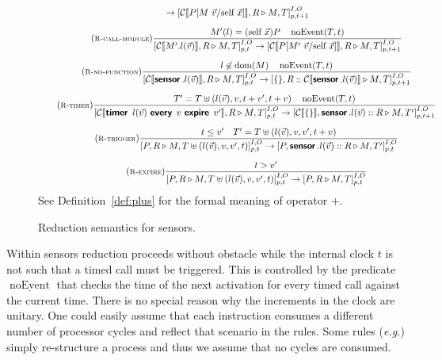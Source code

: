 \documentclass[copyright,creativecommons]{eptcs}
\def\eg{\emph{e.g.}\;}
\newcommand{\keyw}[1]{\textbf{\textsf{#1}}\,}
\newcommand{\firek}{\keyw{timer}}
\newcommand{\everyk}{\keyw{every}}
\newcommand{\expirek}{\keyw{expire}}
\newcommand{\branek}{\keyw{sensor}}
\newcommand{\selfk}{\text{self}}
\newcommand{\sensor}[6]{[{#1} \triangleright {#2}]^{{#3}, {#4}}_{{#5}, {#6}}}
\newcommand{\invk}[3]{{#1}.{#2}({#3})}
\newcommand{\fire}[3]{\firek\ {#1}\ \everyk\ {#2}\ \expirek\ {#3}}
\newcommand{\msg}[2]{{#1}({#2})}
\newcommand{\msgd}{\msg l {\vec v}}
\def\obj#1{\{#1\}}
\newcommand{\dom}{\operatorname{dom}}
\newcommand{\subs}[2]{[{#1}/{#2}]}
\newcommand{\reduces}{\rightarrow}
\newcommand{\mkRrule}[1]{{\footnotesize \textsc{R-#1}}}
\newcommand{\Rlet}{\mkRrule{let}}
\newcommand{\Rfire}{\mkRrule{timer}}
\newcommand{\RcallM}{\mkRrule{call-module}}
\newcommand{\Rnocall}{\mkRrule{no-function}}
\newcommand{\Rtrigger}{\mkRrule{trigger}}
\newcommand{\Rdiscard}{\mkRrule{expire}}
\newcommand{\rulespace}{0.2cm}
\newcommand{\noEvent}[2]{\mathop{\mathrm{noEvent}}\nolimits ({#1}, {#2})}
\newcommand{\noEventd}{\noEvent T t}
\begin{document}
\begin{figure}
\begin{gather*}
{       \reduces
       \sensor {\context{P\subs {M\ \vec v} {\selfk\ \vec x}},R} {M, T} I O p {t+1} 
     }
     \\[\rulespace]
    \tag{\RcallM}
     \frac{
       M'(l) = (\selfk\ \vec x) P \quad  \noEventd
     }{
       \sensor {\context{\invk {M'} l {\vec v}},R} {M,T} I O p t 
       \reduces
       \sensor {\context{P\subs {M'\ \vec v} {\selfk\ \vec x}},R} {M, T} I O p {t+1} 
     }
     \\[\rulespace]
     \tag{\Rnocall}
     \frac{
       l \not\in \dom(M) \quad  \noEventd
     }{
       \sensor {\context{\invk \branek l {\vec v}},R} {M,T} I O p t 
       \reduces
       \sensor {\obj{},R::\context{\invk \branek l {\vec v}}} {M, T} I O p {t+1} 
     }
    \\[\rulespace]
    \tag{\Rfire}
     \frac{
T' = T \uplus (\msgd, v, t + v', t + v)
       \quad \noEventd
}{
       \sensor {\context{\fire \msgd {v} {v'}},R} {M,T} I O p t 
       \reduces
       \sensor {\context{\obj{}},\invk \branek l {\vec v}::R} {M,T'} I O p {t+1} 
     }
     \\[\rulespace]
    \tag{\Rtrigger}
     \frac{
       t \le v'  \quad  T' = T \uplus (\msgd, v, v', t + v) 
     }{
       \sensor {P,R} {M,T \uplus (\msgd, v, v', t)} I O p t 
       \reduces
       \sensor {P,\invk \branek l {\vec v}::R} {M, T'} I O p t 
     }
     \\[\rulespace]
    \tag{\Rdiscard}
     \frac{
       t > v'
     }{
       \sensor {P,R} {M,T \uplus (\msgd, v, v', t)} I O p t 
       \reduces
       \sensor {P,R} {M, T} I O p t 
     }
\end{gather*}
\center See Definition~\ref{def:plus} for the formal meaning of operator $+$.
\caption{Reduction semantics for sensors.}
\label{fig:reduction}
\end{figure}



Within sensors reduction proceeds without obstacle while the internal
clock $t$ is not such that a timed call must be triggered. This is
controlled by the predicate $\underline{\mathop{\mathrm{noEvent}}}$
that checks the time of the next activation for every timed call
against the current time.
There is no special reason
why the increments in the clock are unitary. One could easily assume
that each instruction consumes a different number of processor cycles
and reflect that scenario in the rules. Some rules (\eg \Rlet{})
simply re-structure a process and thus we assume that no cycles are
consumed.
\end{document}
